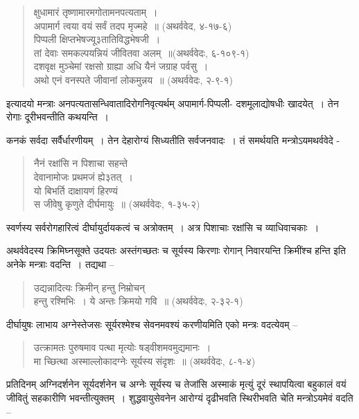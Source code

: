 {\begin{verse}
{क्षुधामारं तृष्णामारमगोतामनपत्यताम्~। }\\
{अपामार्ग त्वया वयं सर्वं तदप मृज्महे~॥} (अथर्ववेद, ४-१७-६)\\
{पिप्पली क्षिप्तभेषज्यू३तातिविद्धभेषजी~। }\\
{तां देवाः समकल्पयन्नियं जीवितवा अलम्~॥}(अथर्ववेदः, ६-१०९-१)\\
{दशवृक्ष मुञ्चेमां रक्षसो ग्राह्या अधि यैनं जग्राह पर्वसु~। }\\
{अथो एनं वनस्पते जीवानां लोकमुन्नय~॥} (अथर्ववेदः, २-९-१)
\end{verse}

इत्यादयो मन्त्राः अनपत्यतासन्धिवातादिरोगनिवृत्यर्थम् अपामार्ग-पिप्पली- दशमूलाद्योषधीः खादयेत्~। तेन रोगाः दूरीभवन्तीति कथयन्ति~। 

कनकं सर्वदा सर्वैर्धारणीयम्~। तेन देहारोग्यं सिध्यतीति सर्वजनवादः~। तं समर्थयति मन्त्रोऽयमथर्ववेदे -

\begin{verse}
{नैनं रक्षांसि न पिशाचा सहन्ते}\\
{देवानामोजः प्रथमजं ह्ये३तत्~। }\\
{यो बिभर्ति दाक्षायणं हिरण्यं}\\
{स जीवेषु कृणुते दीर्घमायुः~॥} (अथर्ववेदः, १-३५-२)
\end{verse}

स्वर्णस्य सर्वरोगहारित्वं दीर्घायुर्दायकत्वं च अत्रोक्तम्~। अत्र पिशाचाः रक्षांसि च व्याधिवाचकाः~। 

अथर्ववेदस्य क्रिमिघ्नसूक्ते उदयतः अस्तंगच्छतः च सूर्यस्य किरणाः रोगान् निवारयन्ति क्रिमींश्च हन्ति इति अनेके मन्त्राः वदन्ति~। तद्यथा –

\begin{verse}
{उद्यन्नादित्यः क्रिमीन् हन्तु निम्रोचन्}\\
{हन्तु रश्मिभिः~। ये अन्तः क्रिमयो गवि~॥} (अथर्ववेदः, २-३२-१)
\end{verse}

दीर्घायुषः लाभाय अग्नेस्तेजसः सूर्यरश्मेश्च सेवनमवश्यं करणीयमिति एको मन्त्रः वदत्येवम् –

\begin{verse}
{उत्क्रामतः पुरुषमाव पत्था मृत्योः षड्वीशमवमुद्यमानः~। }\\
{मा च्छित्था अस्माल्लोकादग्नेः सूर्यस्य संदृशः~॥} (अथर्ववेदः, ८-१-४)
\end{verse}

प्रतिदिनम् अग्निदर्शनेन सूर्यदर्शनेन च अग्नेः सूर्यस्य च तेजांसि अस्माकं मृत्युं दूरं स्थापयित्वा बहुकालं वयं जीवितुं सहकारीणि भवन्तीत्युक्तम्~। शुद्धवायुसेवनेन आरोग्यं दृढीभवति स्थिरीभवति चेति मन्त्रोऽयमेवं वदति –

}
